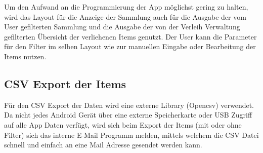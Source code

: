 Um den Aufwand an die Programmierung der App möglichst gering zu halten, wird das Layout für die Anzeige der Sammlung auch für die Ausgabe der vom User gefilterten Sammlung und die Ausgabe der von der Verleih Verwaltung gefilterten Übersicht der verliehenen Items genutzt. Der User kann die Parameter für den Filter im selben Layout wie zur manuellen Eingabe oder Bearbeitung der Items nutzen.   

\subsection{CSV Export der Items}

Für den CSV Export der Daten wird eine externe Library (Opencsv) verwendet. Da nicht jedes Android Gerät über eine externe Speicherkarte oder USB Zugriff auf alle App Daten verfügt, wird sich beim Export der Items (mit oder ohne Filter) sich das interne E-Mail Programm melden, mittels welchem die CSV Datei schnell und einfach an eine Mail Adresse gesendet werden kann.

